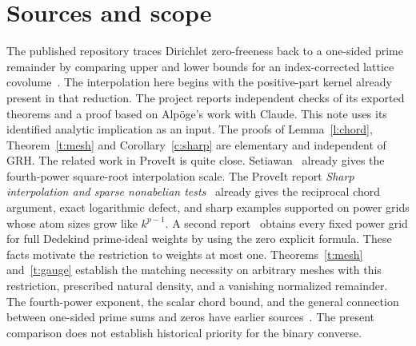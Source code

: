 \documentclass[11pt]{article}
\begin{document}
\section{Sources and scope}
The published repository traces Dirichlet zero-freeness back to a one-sided prime remainder by comparing upper and lower bounds for an index-corrected lattice covolume~\cite{grh}. The interpolation here begins with the positive-part kernel already present in that reduction. The project reports independent checks of its exported theorems and a proof based on Alp\"oge's work with Claude. This note uses its identified analytic implication as an input. The proofs of Lemma~\ref{l:chord}, Theorem~\ref{t:mesh} and Corollary~\ref{c:sharp} are elementary and independent of GRH. The related work in ProveIt is quite close. Setiawan~\cite{setiawan} already gives the fourth-power square-root interpolation scale. The ProveIt report \emph{Sharp interpolation and sparse nonabelian tests}~\cite{prior} already gives the reciprocal chord argument, exact logarithmic defect, and sharp examples supported on power grids whose atom sizes grow like $k^{p-1}$. A second report~\cite{powers} obtains every fixed power grid for full Dedekind prime-ideal weights by using the zero explicit formula. These facts motivate the restriction to weights at most one. Theorems~\ref{t:mesh} and~\ref{t:gauge} establish the matching necessity on arbitrary meshes with this restriction, prescribed natural density, and a vanishing normalized remainder. The fourth-power exponent, the scalar chord bound, and the general connection between one-sided prime sums and zeros have earlier sources~\cite{setiawan,prior,specht,suzuki}. The present comparison does not establish historical priority for the binary converse.
\end{document}
